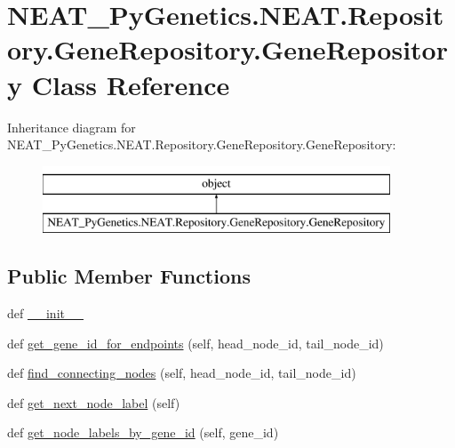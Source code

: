 \hypertarget{classNEAT__PyGenetics_1_1NEAT_1_1Repository_1_1GeneRepository_1_1GeneRepository}{}\section{N\+E\+A\+T\+\_\+\+Py\+Genetics.\+N\+E\+A\+T.\+Repository.\+Gene\+Repository.\+Gene\+Repository Class Reference}
\label{classNEAT__PyGenetics_1_1NEAT_1_1Repository_1_1GeneRepository_1_1GeneRepository}
Inheritance diagram for N\+E\+A\+T\+\_\+\+Py\+Genetics.\+N\+E\+A\+T.\+Repository.\+Gene\+Repository.\+Gene\+Repository\+:\begin{figure}[H]
\begin{center}
\leavevmode
\includegraphics[height=2.000000cm]{classNEAT__PyGenetics_1_1NEAT_1_1Repository_1_1GeneRepository_1_1GeneRepository}
\end{center}
\end{figure}
\subsection*{Public Member Functions}
\begin{DoxyCompactItemize}
\item 
def \hyperlink{classNEAT__PyGenetics_1_1NEAT_1_1Repository_1_1GeneRepository_1_1GeneRepository_a47867f001b69fb1af342bd56077eb2d1}{\+\_\+\+\_\+init\+\_\+\+\_\+}
\item 
def \hyperlink{classNEAT__PyGenetics_1_1NEAT_1_1Repository_1_1GeneRepository_1_1GeneRepository_acf117ca8d8fb85263ab1e419e795bc3f}{get\+\_\+gene\+\_\+id\+\_\+for\+\_\+endpoints} (self, head\+\_\+node\+\_\+id, tail\+\_\+node\+\_\+id)
\item 
def \hyperlink{classNEAT__PyGenetics_1_1NEAT_1_1Repository_1_1GeneRepository_1_1GeneRepository_a12b448287c1e00d71325a0f4f5191b0b}{find\+\_\+connecting\+\_\+nodes} (self, head\+\_\+node\+\_\+id, tail\+\_\+node\+\_\+id)
\item 
def \hyperlink{classNEAT__PyGenetics_1_1NEAT_1_1Repository_1_1GeneRepository_1_1GeneRepository_a1cf66c6d6fbb68a38a5915ccfbab77cb}{get\+\_\+next\+\_\+node\+\_\+label} (self)
\item 
def \hyperlink{classNEAT__PyGenetics_1_1NEAT_1_1Repository_1_1GeneRepository_1_1GeneRepository_a135cdf881aca932199a40ace71aa88e2}{get\+\_\+node\+\_\+labels\+\_\+by\+\_\+gene\+\_\+id} (self, gene\+\_\+id)
\end{DoxyCompactItemize}


